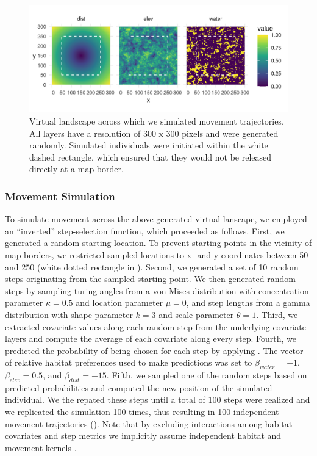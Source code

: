 \documentclass[abstract=on,10pt,a4paper,bibliography=totocnumbered]{article}
\begin{document}
\begin{figure}
  \begin{center}
  \includegraphics[width = \textwidth]{99_Covariates.png}
  \caption{Virtual landscape across which we simulated movement trajectories.
  All layers have a resolution of 300 x 300 pixels and were generated randomly.
  Simulated individuals were initiated within the white dashed rectangle, which
  ensured that they would not be released directly at a map border.}
  \label{Covariates}
  \end{center}
\end{figure}

\subsubsection{Movement Simulation}
To simulate movement across the above generated virtual lanscape, we employed an
``inverted'' step-selection function, which proceeded as follows. First, we
generated a random starting location. To prevent starting points in the vicinity
of map borders, we restricted sampled locations to x- and y-coordinates between
50 and 250 (white dotted rectangle in ). Second, we generated a
set of 10 random steps originating from the sampled starting point. We then
generated random steps by sampling turing angles from a von Mises distribution
with concentration parameter \(\kappa = 0.5\) and location parameter \( \mu = 0
\), and step lengths from a gamma distribution with shape parameter \(k = 3 \)
and scale parameter \(\theta = 1\). Third, we extracted covariate values along
each random step from the underlying covariate layers and compute the average of
each covariate along every step. Fourth, we predicted the probability of being
chosen for each step by applying . The vector of relative habitat
preferences used to make predictions was set to \(\beta_{water} = -1\),
\(\beta_{elev} = 0.5\), and \(\beta_{dist} = -15\). Fifth, we sampled one of the
random steps based on predicted probabilities and computed the new position of
the simulated individual. We the repated these steps until a total of 100 steps
were realized and we replicated the simulation 100 times, thus resulting in 100
independent movement trajectories (). Note that by excluding
interactions among habitat covariates and step metrics we implicitly assume
independent habitat and movement kernels \citep{Avgar.2016}.
\end{document}
